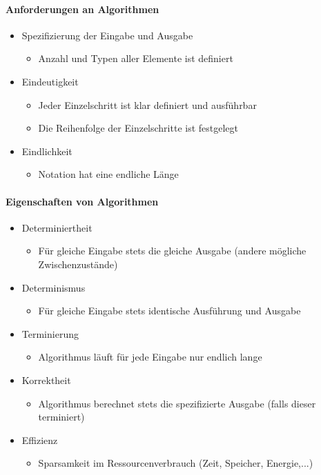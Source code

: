 \paragraph{Anforderungen an Algorithmen}
    \begin{itemize}
      	\item Spezifizierung der Eingabe und Ausgabe 
        	\begin{itemize}
          		\item Anzahl und Typen aller Elemente ist definiert
        	\end{itemize}
		\item Eindeutigkeit
        	\begin{itemize}
          		\item Jeder Einzelschritt ist klar definiert und ausführbar 
          		\item Die Reihenfolge der Einzelschritte ist festgelegt
        	\end{itemize}
      	\item Eindlichkeit
        	\begin{itemize}
          		\item Notation hat eine endliche Länge
        	\end{itemize}
	\end{itemize}

\paragraph{Eigenschaften von Algorithmen}
	\begin{itemize}
		\item Determiniertheit
			\begin{itemize}
				\item Für gleiche Eingabe stets die gleiche Ausgabe (andere mögliche Zwischenzustände)
			\end{itemize}
		\item Determinismus
			\begin{itemize}
				\item Für gleiche Eingabe stets identische Ausführung und Ausgabe
			\end{itemize}
		\item Terminierung
			\begin{itemize}
				\item Algorithmus läuft für jede Eingabe nur endlich lange
			\end{itemize}
		\item Korrektheit
			\begin{itemize}
				\item Algorithmus berechnet stets die spezifizierte Ausgabe (falls dieser terminiert)
			\end{itemize}
		\item Effizienz
			\begin{itemize}
				\item Sparsamkeit im Ressourcenverbrauch (Zeit, Speicher, Energie,...)
			\end{itemize}
	\end{itemize}

